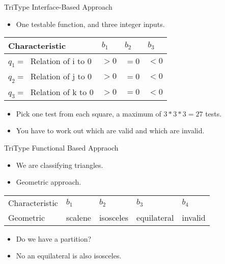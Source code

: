 \documentclass{beamer}
\begin{document}
\begin{frame}{TriType Interface-Based Approach}
  \begin{itemize}
  \item One testable function, and three integer inputs.
  \end{itemize}
  \begin{tabular}{||l|l|l|l||}
\hline 
 Characteristic & $b_1$ &  $b_2$ & $b_3$ \\ \hline
 $q_1 = \ $ Relation of i  to $0$ & $>0$ & $=0$ & $<0$ \\
 $q_2 = \ $ Relation of j  to $0$ & $>0$ & $=0$ & $<0$ \\
 $q_3 = \ $ Relation of k  to $0$ & $>0$ & $=0$ & $<0$ \\
\hline    
\end{tabular}
\begin{itemize}
\item Pick one test from each square, a maximum of $3*3*3=27$ tests. 
\item You have to work out which are valid and which are invalid.
\end{itemize}
\end{frame}
\begin{frame}{TriType  Functional Based Appraoch}
  \begin{itemize}
  \item We are classifying triangles.
  \item Geometric approach.
  \end{itemize}
  \begin{tabular}{||l|l|l|l|l||}\hline 
    Characteristic & $b_1$  & $b_2$ & $b_3$ & $b_4$\\
    Geometric  &  scalene & isosceles &
    equilateral & invalid \\
    \hline
  \end{tabular}
  \begin{itemize}
  \item Do we have a partition? 
  \item No an equilateral is also isosceles.
  \end{itemize}
\end{frame}
\end{document}
